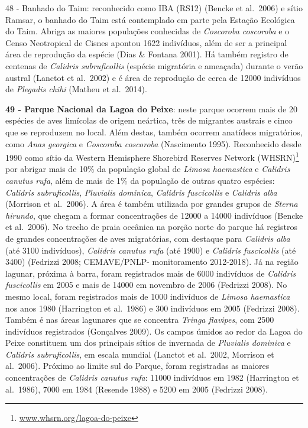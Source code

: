 \documentclass[
  oneside]{scrbook}
\DeclareRobustCommand{\href}[2]{#2\footnote{\url{#1}}}
\begin{document}
48 - Banhado do Taim: reconhecido como IBA (RS12) (Bencke et al.~2006) e sítio Ramsar, o banhado do Taim está contemplado em parte pela Estação Ecológica do Taim. Abriga as maiores populações conhecidas de \emph{Coscoroba coscoroba} e o Censo Neotropical de Cisnes apontou 1622 indivíduos, além de ser a principal área de reprodução da espécie (Dias \& Fontana 2001). Há também registro de centenas de \emph{Calidris subruficollis} (espécie migratória e ameaçada) durante o verão austral (Lanctot et al.~2002) e é área de reprodução de cerca de 12000 indivíduos de \emph{Plegadis chihi} (Matheu et al.~2014).

\textbf{49 - Parque Nacional da Lagoa do Peixe}: neste parque ocorrem mais de 20 espécies de aves limícolas de origem neártica, três de migrantes austrais e cinco que se reproduzem no local. Além destas, também ocorrem anatídeos migratórios, como \emph{Anas georgica} e \emph{Coscoroba coscoroba} (Nascimento 1995). Reconhecido desde 1990 como \href{www.whsrn.org/lagoa-do-peixe}{sítio da Western Hemisphere Shorebird Reserves Network (WHSRN)} por abrigar mais de 10\% da população global de \emph{Limosa haemastica} e \emph{Calidris canutus rufa}, além de mais de 1\% da população de outras quatro espécies: \emph{Calidris subruficollis}, \emph{Pluvialis dominica}, \emph{Calidris fuscicollis} e \emph{Calidris alba} (Morrison et al.~2006). A área é também utilizada por grandes grupos de \emph{Sterna hirundo}, que chegam a formar concentrações de 12000 a 14000 indivíduos (Bencke et al.~2006). No trecho de praia oceânica na porção norte do parque há registros de grandes concentrações de aves migratórias, com destaque para \emph{Calidris alba} (até 3100 indivíduos), \emph{Calidris canutus rufa} (até 1900) e \emph{Calidris fuscicollis} (até 3400) (Fedrizzi 2008; CEMAVE/PNLP- monitoramento 2012-2018). Já na região lagunar, próxima à barra, foram registrados mais de 6000 indivíduos de \emph{Calidris fuscicollis} em 2005 e mais de 14000 em novembro de 2006 (Fedrizzi 2008). No mesmo local, foram registrados mais de 1000 indivíduos de \emph{Limosa haemastica} nos anos 1980 (Harrington et al.~1986) e 300 indivíduos em 2005 (Fedrizzi 2008). Também é nas áreas lagunares que se concentra \emph{Tringa flavipes}, com 2500 indivíduos registrados (Gonçalves 2009). Os campos úmidos ao redor da Lagoa do Peixe constituem um dos principais sítios de invernada de \emph{Pluvialis dominica} e \emph{Calidris subruficollis}, em escala mundial (Lanctot et al.~2002, Morrison et al.~2006). Próximo ao limite sul do Parque, foram registradas as maiores concentrações de \emph{Calidris canutus rufa}: 11000 indivíduos em 1982 (Harrington et al.~1986), 7000 em 1984 (Resende 1988) e 5200 em 2005 (Fedrizzi 2008).
\end{document}
